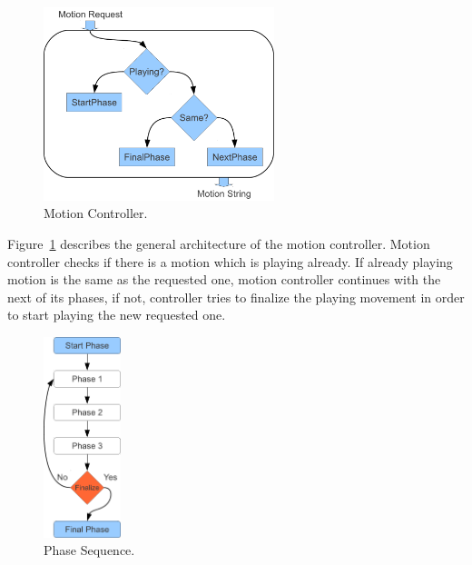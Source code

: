 \begin{figure}[t!]
\centering
  \includegraphics[width=0.6\textwidth]{Chapter3/figures/MotionController.pdf}
  \caption{Motion Controller.}
  \label{fig:MotionController}
\end{figure}


Figure~\ref{fig:MotionController} describes the general architecture of the motion controller. Motion controller checks if there is a motion which is playing already. If   already playing motion is the same as the requested one, motion controller continues with the next of its phases, if not, controller tries to finalize the playing movement in order to start playing the new requested one.


\begin{figure}[t!]
\centering
  \includegraphics[width=0.2\textwidth]{Chapter3/figures/MotionSequence.pdf}
  \caption{Phase Sequence.}
  \label{fig:PhaseSequence}
\end{figure}


